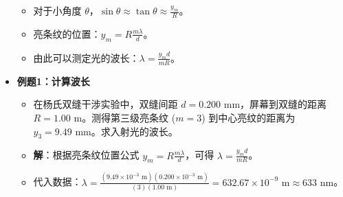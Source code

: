 \documentclass[UTF8]{ctexart}
\begin{document}
\begin{itemize}
        \begin{itemize}
            \item 对于小角度 $\theta$，$\sin\theta \approx \tan\theta \approx \frac{y_m}{R}$。
            \item 亮条纹的位置：$y_m = R \frac{m\lambda}{d}$。
            \item 由此可以测定光的波长：$\lambda = \frac{y_m d}{mR}$。
        \end{itemize}
    \item \textbf{例题1：计算波长}
        \begin{itemize}
            \item 在杨氏双缝干涉实验中，双缝间距 $d = 0.200 \text{ mm}$，屏幕到双缝的距离 $R = 1.00 \text{ m}$。测得第三级亮条纹 ($m=3$) 到中心亮纹的距离为 $y_3 = 9.49 \text{ mm}$。求入射光的波长。
            \item \textbf{解}：根据亮条纹位置公式 $y_m = R \frac{m\lambda}{d}$，可得 $\lambda = \frac{y_m d}{mR}$。
            \item 代入数据：$\lambda = \frac{(9.49 \times 10^{-3} \text{ m})(0.200 \times 10^{-3} \text{ m})}{(3)(1.00 \text{ m})} = 632.67 \times 10^{-9} \text{ m} \approx 633 \text{ nm}$。
        \end{itemize}
\end{itemize}
\end{document}
